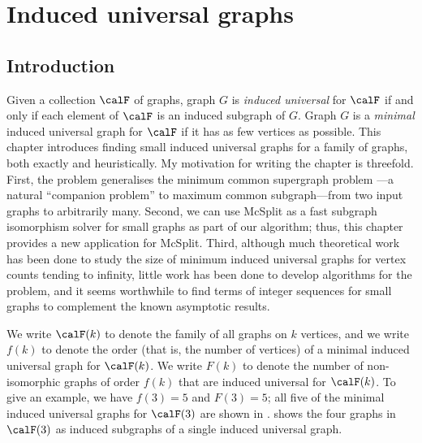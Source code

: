 \chapter{Induced universal graphs}
\label{c:mcsplit-i-undirected}

%
%

\section{Introduction}

Given a collection $\calF$ of graphs, graph $G$ is \emph{induced universal} for
$\calF$ if and only if each element of $\calF$ is an induced subgraph of $G$.
Graph $G$ is a \emph{minimal} induced universal graph for $\calF$ if it has as
few vertices as possible.
This chapter introduces  finding
small induced universal graphs for a family of graphs, both exactly and heuristically.
My motivation for writing the chapter is threefold.
First, the problem generalises the minimum common supergraph problem
\cite{DBLP:journals/computing/BunkeJK00}---a natural ``companion problem''
to maximum common subgraph---from two input graphs to arbitrarily many.  Second, we
can use McSplit as a fast subgraph isomorphism solver for small graphs as part
of our algorithm; thus, this chapter provides a new application for McSplit.
Third, although much theoretical work has been done to study the size of minimum
induced universal graphs for vertex counts tending to infinity, little work has
been done to develop algorithms
for the problem, and it seems worthwhile to find terms of integer sequences for
small graphs to complement the known asymptotic results.

We write $\calF(k)$ to denote the family of all graphs on $k$ vertices,
and we write $f(k)$ to denote the order (that is, the
number of vertices) of a minimal induced universal graph for $\calF(k)$.
We write $F(k)$ to denote the number of non-isomorphic graphs of order $f(k)$
that are induced universal for $\calF(k)$.
To give an example, we have $f(3)=5$ and $F(3)=5$; all five of the minimal
induced universal graphs
for $\calF(3)$ are shown in .  shows the four
graphs in $\calF(3)$ as induced subgraphs of a single induced universal graph.

